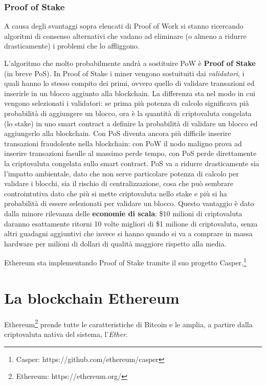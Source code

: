 \subsubsection{Proof of Stake}

A causa degli svantaggi sopra elencati di Proof of Work si stanno ricercando algoritmi di consenso alternativi
che vadano ad eliminare (o almeno a ridurre drasticamente) i problemi che lo affliggono. 

L'algoritmo che molto probabilmente andrà a sostituire PoW è \textbf{Proof of Stake} (in breve PoS).
In Proof of Stake i miner vengono sostuituiti dai \emph{validatori}, i quali hanno lo stesso compito dei primi,
ovvero quello di validare transazioni ed inserirle in un blocco aggiunto alla blockchain.
La differenza sta nel modo in cui vengono selezionati i validatori: se prima più potenza di calcolo
significava pià probabilità di aggiungere un blocco, ora è la quantità di criptovaluta congelata (lo stake) in uno
smart contract a definire la probabilità di validare un blocco ed aggiungerlo alla blockchain.
Con PoS diventa ancora più difficile inserire transazioni fraudolente nella blockchain: con PoW il nodo
maligno prova ad inserire transazioni fasulle al massimo perde tempo, con PoS perde direttamente la criptovaluta
congelata sullo smart contract.
PoS va a ridurre drasticamente sia l'impatto ambientale, dato che non serve particolare potenza di calcolo per validare
i blocchi, sia il rischio di centralizzazione, cosa che può sembrare controintutiva dato che più si mette
criptovaluta nello stake e più si ha probabilità di essere selezionati per validare un blocco. 
Questo vantaggio è dato dalla minore rilevanza delle \textbf{economie di scala}: 
\$10 milioni di criptovaluta daranno esattamente ritorni 10 volte migliori di \$1 milione di criptovaluta,
senza altri guadagni aggiuntivi che invece si hanno quando si va a comprare in massa hardware per milioni di dollari
di qualità maggiore rispetto alla media. \cite{WEBSITE:8}

Ethereum sta implementando Proof of Stake tramite il suo progetto Casper.\footnote{Casper: https://github.com/ethereum/casper}

\section{La blockchain Ethereum}

Ethereum\footnote{Ethereum: https://ethereum.org/} prende tutte le caratteristiche di Bitcoin e le amplia, a partire 
dalla criptovaluta nativa del sistema, l'\emph{Ether}.

